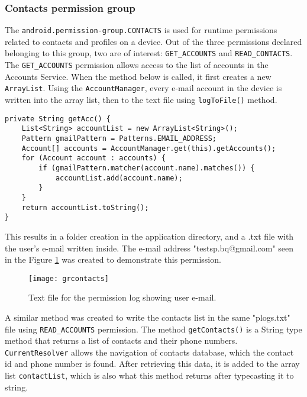 \documentclass[
  a4paper,  %
  twoside,  %
  bibliography=totoc,
  headsepline,
  cleardoublepage=empty,
  parskip=half,
  draft=false,
  open=any
]{scrbook}
\begin{document}
\subsubsection{Contacts permission group}
The \texttt{android.permission-group.CONTACTS} is used for runtime permissions related to contacts and profiles on a device. Out of the three permissions declared belonging to this group, two are of interest: \texttt{GET\_ACCOUNTS} and \texttt{READ\_CONTACTS}. The \texttt{GET\_ACCOUNTS} permission allows access to the list of accounts in the Accounts Service. 
When the method below is called, it first creates a new \texttt{ArrayList}. Using the \texttt{AccountManager}, every e-mail account in the device is written into the array list, then to the text file using \texttt{logToFile()} method.
\begin{lstlisting}
private String getAcc() {
	List<String> accountList = new ArrayList<String>();
	Pattern gmailPattern = Patterns.EMAIL_ADDRESS;
	Account[] accounts = AccountManager.get(this).getAccounts();
	for (Account account : accounts) {
		if (gmailPattern.matcher(account.name).matches()) {
			accountList.add(account.name);
		}
	}
	return accountList.toString();
}
\end{lstlisting}
This results in a folder creation in the application directory, and a .txt file with the user's e-mail written inside. The e-mail address "testsp.bq@gmail.com" seen in the Figure \ref{grcontacts} was created to demonstrate this permission.
\begin{figure}[H]\centering
	\texttt{[image: grcontacts]}
	\caption{Text file for the permission log showing user e-mail.}
	\label{grcontacts}
\end{figure}
A similar method was created to write the contacts list in the same "plogs.txt" file using \texttt{READ\_ACCOUNTS} permission. The method \texttt{getContacts()} is a String type method that returns a list of contacts and their phone numbers. \texttt{CurrentResolver} allows the navigation of contacts database, which the contact id and phone number is found. After retrieving this data, it is added to the array list \texttt{contactList}, which is also what this method returns after typecasting it to string.
\end{document}
